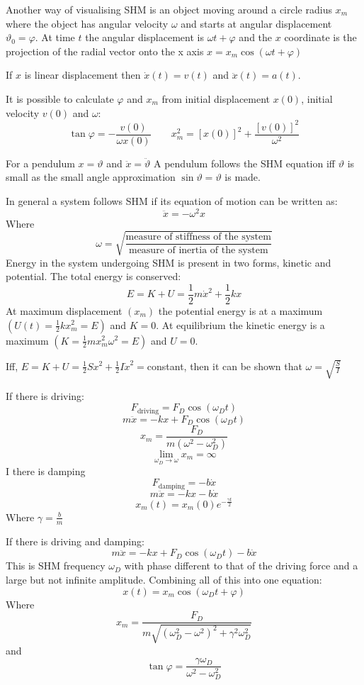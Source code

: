 \documentclass{article}
\begin{document}
Another way of visualising SHM is an object moving around a circle radius \(x_m\) where the object has angular velocity \(\omega\) and starts at angular displacement \(\vartheta_0=\varphi\). At time \(t\) the angular displacement is \(\omega t+\varphi\) and the \(x\) coordinate is the projection of the radial vector onto the x axis \(x=x_m\cos(\omega t+\varphi)\)

If \(x\) is linear displacement then \(\dot x(t)=v(t)\) and \(\ddot x(t)=a(t)\).

It is possible to calculate \(\varphi\) and \(x_m\) from initial displacement \(x(0)\), initial velocity \(v(0)\) and \(\omega\):
\[\tan\varphi=-\frac{v(0)}{\omega x(0)}\qquad x_m^2=[x(0)]^2+\frac{[v(0)]^2}{\omega^2}\]

For a pendulum \(x=\vartheta\) and \(\ddot x=\ddot \vartheta\) A pendulum follows the SHM equation iff \(\vartheta\) is small as the small angle approximation \(\sin\vartheta=\vartheta\) is made.

In general a system follows SHM if its equation of motion can be written as:
\[\ddot x=-\omega^2x\]
Where
\[\omega=\sqrt{\frac{\text{measure of stiffness of the system}}{\text{measure of inertia of the system}}}\]
Energy in the system undergoing SHM is present in two forms, kinetic and potential. The total energy is conserved:
\[E=K+U=\frac12m\dot x^2+\frac12kx\]
At maximum displacement \((x_m)\) the potential energy is at a maximum \(\left(U(t)=\frac12kx_m^2=E\right)\) and \(K=0\). At equilibrium the kinetic energy is a maximum \(\left(K=\frac12mx_m^2\omega^2=E\right)\) and \(U=0\).

Iff, \(E=K+U=\frac12Sx^2+\frac12I\dot x^2=\)constant, then it can be shown that \(\omega=\sqrt{\frac SI}\)

If there is driving:
\[F_{\text{driving}}=F_D\cos(\omega_Dt)\]
\[m\ddot x=-kx+F_D\cos(\omega_Dt)\]
\[x_m=\frac{F_D}{m(\omega^2-\omega_D^2)}\]
\[\lim_{\omega_D\to\omega}x_m=\infty\]
I there is damping
\[F_{\text{damping}}=-b\dot x\]
\[m\ddot x=-kx-b\dot x\]
\[x_m(t)=x_m(0)e^{-\frac{\gamma t}{2}}\]
Where \(\gamma=\frac bm\)

If there is driving and damping:
\[m \ddot x=-kx+F_D\cos(\omega_Dt)-b\dot x\]
This is SHM frequency \(\omega_D\) with phase different to that of the driving force and a large but not infinite amplitude.
Combining all of this into one equation:
\[x(t)=x_m\cos(\omega_Dt+\varphi)\]
Where \[x_m=\frac{F_D}{m\sqrt{(\omega_D^2-\omega^2)^2+\gamma^2\omega_D^2}}\]
and \[\tan\varphi=\frac{\gamma\omega_D}{\omega^2-\omega_D^2}\]
\end{document}
